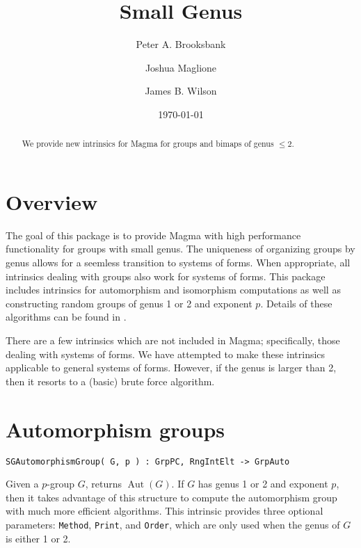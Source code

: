 \documentclass{amsart}
\title{Small Genus}
\author{Peter A. Brooksbank}
\author{Joshua Maglione}
\author{James B. Wilson}
\date{\today}
\DeclareMathOperator{\Aut}{Aut}
\begin{document}
\begin{abstract}
We provide new intrinsics for {\sc Magma} for groups and bimaps of genus $\leq 2$.
\end{abstract}

\maketitle
\tableofcontents

\section{Overview}

The goal of this package is to provide {\sc Magma} \cite{Magma} with high performance functionality for groups with small genus. 
The uniqueness of organizing groups by genus allows for a seemless transition to systems of forms.
When appropriate, all intrinsics dealing with groups also work for systems of forms. 
This package includes intrinsics for automorphism and isomorphism computations as well as constructing random groups of genus 1 or 2 and exponent $p$.
Details of these algorithms can be found in \cite{BMW}.

There are a few intrinsics which are not included in {\sc Magma}; specifically, those dealing with systems of forms. 
We have attempted to make these intrinsics applicable to general systems of forms. However, if the genus is larger than 2, then it resorts to a (basic) brute force algorithm. 

\section{Automorphism groups}

\color{blue}
\begin{verbatim}
SGAutomorphismGroup( G, p ) : GrpPC, RngIntElt -> GrpAuto
\end{verbatim}

\color{black}
Given a $p$-group $G$, returns $\Aut(G)$.
If $G$ has genus 1 or 2 and exponent $p$, then it takes advantage of this structure 
to compute the automorphism group with much more efficient algorithms.
This intrinsic provides three optional parameters: {\tt Method}, {\tt Print}, and {\tt Order}, 
which are only used when the genus of $G$ is either 1 or 2.
\end{document}
